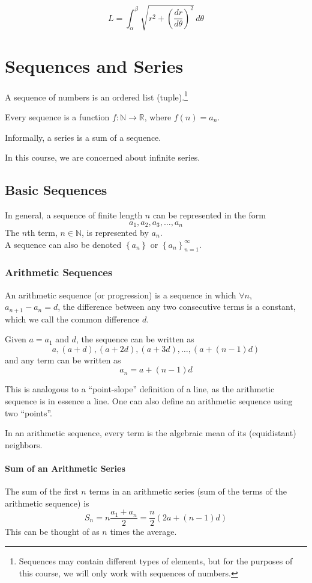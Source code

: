 \documentclass{article}
\begin{document}
$$L = \int_{\alpha}^{\beta} \sqrt{r^2 + \left(\frac{dr}{d\theta}\right)^2} \,d\theta$$

\section{Sequences and Series}
A sequence of numbers is an ordered list (tuple).\footnote{Sequences may contain different types of elements, but for the purposes of this course, we will only work with sequences of numbers.}

Every sequence is a function $f: \mathbb{N} \to \mathbb{R}$, where $f(n) = a_n$.

Informally, a series is a sum of a sequence.

In this course, we are concerned about infinite series.

\subsection{Basic Sequences}
In general, a sequence of finite length $n$ can be represented in the form
$$a_1, a_2, a_3, \ldots, a_n $$
The $n$th term, $n \in \mathbb{N}$, is represented by $a_n$.\\
A sequence can also be denoted $\left\{ a_n \right\}$ or $\left\{ a_n \right\}_{n = 1}^\infty$.

\subsubsection{Arithmetic Sequences}
An arithmetic sequence (or progression) is a sequence in which $\forall n$, $a_{n+1} - a_n = d$, the difference between any two consecutive terms is a constant, which we call the common difference $d$.

Given $a = a_1$ and $d$, the sequence can be written as
$$a, \left(a + d\right), \left(a + 2d\right), \left(a + 3d\right), \ldots, \left(a + \left(n-1\right)d\right)$$
and any term can be written as
$$a_n = a + (n-1)d$$

This is analogous to a ``point-slope'' definition of a line, as the arithmetic sequence is in essence a line. One can also define an arithmetic sequence using two ``points''.

In an arithmetic sequence, every term is the algebraic mean of its (equidistant) neighbors.

\paragraph{Sum of an Arithmetic Series}
The sum of the first $n$ terms in an arithmetic series (sum of the terms of the arithmetic sequence) is
$$S_n = n\frac{a_1+a_n}{2} = \frac{n}{2}\left(2a + \left(n-1\right)d\right)$$
This can be thought of as $n$ times the average.
\end{document}
